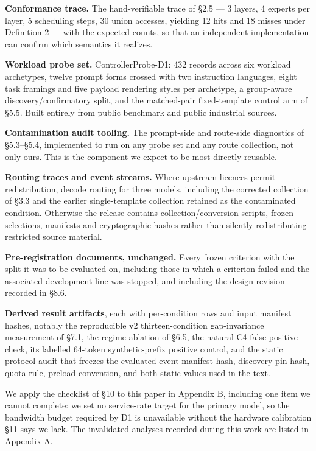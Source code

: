 \documentclass[
  10pt,
  letterpaper,
  10pt]{article}
\begin{document}
\textbf{Conformance trace.} The hand-verifiable trace of §2.5 --- 3
layers, 4 experts per layer, 5 scheduling steps, 30 union accesses,
yielding 12 hits and 18 misses under Definition 2 --- with the expected
counts, so that an independent implementation can confirm which
semantics it realizes.

\textbf{Workload probe set.} ControllerProbe-D1: 432 records across six
workload archetypes, twelve prompt forms crossed with two instruction
languages, eight task framings and five payload rendering styles per
archetype, a group-aware discovery/confirmatory split, and the
matched-pair fixed-template control arm of §5.5. Built entirely from
public benchmark and public industrial sources.

\textbf{Contamination audit tooling.} The prompt-side and route-side
diagnostics of §5.3--§5.4, implemented to run on any probe set and any
route collection, not only ours. This is the component we expect to be
most directly reusable.

\textbf{Routing traces and event streams.} Where upstream licences
permit redistribution, decode routing for three models, including the
corrected collection of §3.3 and the earlier single-template collection
retained as the contaminated condition. Otherwise the release contains
collection/conversion scripts, frozen selections, manifests and
cryptographic hashes rather than silently redistributing restricted
source material.

\textbf{Pre-registration documents, unchanged.} Every frozen criterion
with the split it was to be evaluated on, including those in which a
criterion failed and the associated development line was stopped, and
including the design revision recorded in §8.6.

\textbf{Derived result artifacts}, each with per-condition rows and
input manifest hashes, notably the reproducible v2 thirteen-condition
gap-invariance measurement of §7.1, the regime ablation of §6.5, the
natural-C4 false-positive check, its labelled 64-token synthetic-prefix
positive control, and the static protocol audit that freezes the
evaluated event-manifest hash, discovery pin hash, quota rule, preload
convention, and both static values used in the text.

We apply the checklist of §10 to this paper in Appendix B, including one
item we cannot complete: we set no service-rate target for the primary
model, so the bandwidth budget required by D1 is unavailable without the
hardware calibration §11 says we lack. The invalidated analyses recorded
during this work are listed in Appendix A.
\end{document}
